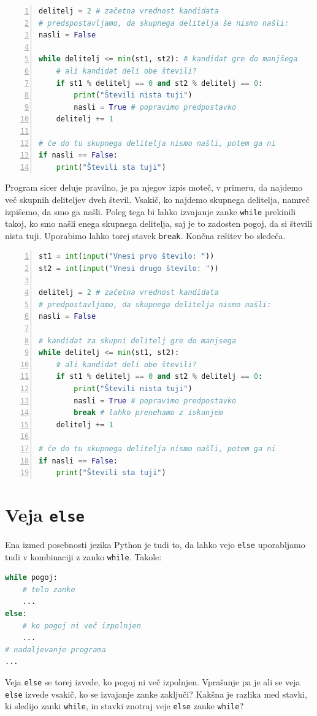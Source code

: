 \begin{resitev}
\begin{lstlisting}[language=Python,numbers=left]
delitelj = 2 # začetna vrednost kandidata
# predspostavljamo, da skupnega delitelja še nismo našli:
nasli = False 

while delitelj <= min(st1, st2): # kandidat gre do manjšega
    # ali kandidat deli obe števili?
    if st1 % delitelj == 0 and st2 % delitelj == 0:
        print("Števili nista tuji")
        nasli = True # popravimo predpostavko
    delitelj += 1

# če do tu skupnega delitelja nismo našli, potem ga ni        
if nasli == False: 
    print("Števili sta tuji")
\end{lstlisting}
Program sicer deluje pravilno, je pa njegov izpis moteč, v primeru, da najdemo več skupnih deliteljev dveh števil. Vsakič, ko najdemo skupnega delitelja, namreč izpišemo, da smo ga našli. Poleg tega bi lahko izvajanje zanke \texttt{while} prekinili takoj, ko smo našli enega skupnega delitelja, saj je to zadosten pogoj, da si števili nista tuji. Uporabimo lahko torej stavek \texttt{break}. Končna rešitev bo sledeča.
\begin{lstlisting}[language=Python,numbers=left]
st1 = int(input("Vnesi prvo število: "))
st2 = int(input("Vnesi drugo število: "))

delitelj = 2 # začetna vrednost kandidata
# predpostavljamo, da skupnega delitelja nismo našli:
nasli = False 

# kandidat za skupni delitelj gre do manjsega
while delitelj <= min(st1, st2): 
    # ali kandidat deli obe števili?
    if st1 % delitelj == 0 and st2 % delitelj == 0:
        print("Števili nista tuji")
        nasli = True # popravimo predpostavko
        break # lahko prenehamo z iskanjem
    delitelj += 1 

# če do tu skupnega delitelja nismo našli, potem ga ni        
if nasli == False: 
    print("Števili sta tuji")
\end{lstlisting}
\end{resitev}

\section{Veja \texttt{else}}
Ena izmed posebnosti jezika Python je tudi to, da lahko vejo \texttt{else} uporabljamo tudi v kombinaciji z zanko \texttt{while}. Takole:
\begin{lstlisting}[language=Python]
while pogoj:
    # telo zanke
    ...
else:
    # ko pogoj ni več izpolnjen
    ...
# nadaljevanje programa
...
\end{lstlisting}
Veja \texttt{else} se torej izvede, ko pogoj ni več izpolnjen. Vprašanje pa je ali se veja \texttt{else} izvede vsakič, ko se izvajanje zanke zaključi? Kakšna je razlika med stavki, ki sledijo zanki \texttt{while}, in stavki znotraj veje \texttt{else} zanke \texttt{while}? 

